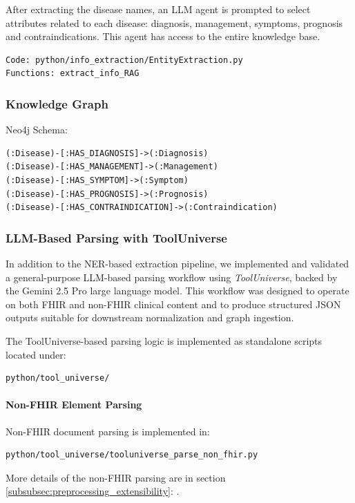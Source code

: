 After extracting the disease names, an LLM agent is prompted to select attributes related to each disease: diagnosis, management, symptoms, prognosis and contraindications. This agent has access to the entire knowledge base.
\begin{verbatim}
Code: python/info_extraction/EntityExtraction.py
Functions: extract_info_RAG
\end{verbatim}


\subsubsection{Knowledge Graph}
Neo4j Schema:
\begin{verbatim}
(:Disease)-[:HAS_DIAGNOSIS]->(:Diagnosis)
(:Disease)-[:HAS_MANAGEMENT]->(:Management)
(:Disease)-[:HAS_SYMPTOM]->(:Symptom)
(:Disease)-[:HAS_PROGNOSIS]->(:Prognosis)
(:Disease)-[:HAS_CONTRAINDICATION]->(:Contraindication)
\end{verbatim}


\subsubsection{LLM-Based Parsing with ToolUniverse}

In addition to the NER-based extraction pipeline, we implemented and validated a general-purpose LLM-based parsing workflow using \textit{ToolUniverse}, backed by the Gemini 2.5 Pro large language model. This workflow was designed to operate on both FHIR and non-FHIR clinical content and to produce structured JSON outputs suitable for downstream normalization and graph ingestion.

The ToolUniverse-based parsing logic is implemented as standalone scripts located under:
\begin{verbatim}
python/tool_universe/
\end{verbatim}


\paragraph{Non-FHIR Element Parsing}
Non-FHIR document parsing is implemented in:
\begin{verbatim}
python/tool_universe/tooluniverse_parse_non_fhir.py
\end{verbatim}

More details of the non-FHIR parsing are in section \ref{subsubsec:preprocessing_extensibility}: .

